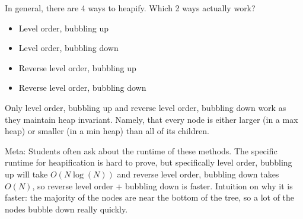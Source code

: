 \question In general, there are 4 ways to heapify. Which 2 ways actually work?

\begin{itemize}
\item Level order, bubbling up
\item Level order, bubbling down
\item Reverse level order, bubbling up
\item Reverse level order, bubbling down
\end{itemize}

\begin{solution}
Only level order, bubbling up and reverse level order, bubbling down work as
they maintain heap invariant. Namely, that every node is either larger (in a
max heap) or smaller (in a min heap) than all of its children.

Meta: Students often ask about the runtime of these methods. The specific runtime for heapification is hard to prove, but specifically level order, bubbling up will take $O(N\log(N))$ and reverse level order, bubbling down takes $O(N)$, so reverse level order + bubbling down is faster. Intuition on why it is faster: the majority of the nodes are near the bottom of the tree, so a lot of the nodes bubble down really quickly. 
\end{solution}
